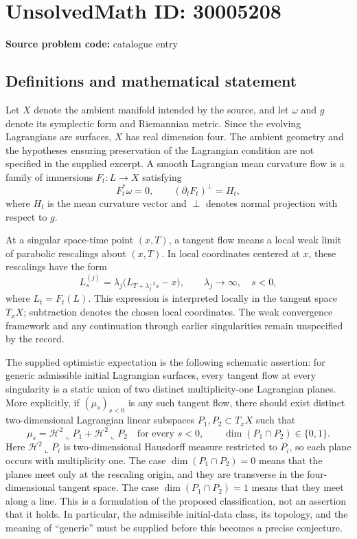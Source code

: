 \documentclass[11pt]{article}
\begin{document}
\section*{UnsolvedMath ID: 30005208}
\textbf{Source problem code:} catalogue entry
\subsection{Definitions and mathematical statement}
Let \(X\) denote the ambient manifold intended by the source, and let \(\omega\) and \(g\) denote its symplectic form and Riemannian metric. Since the evolving Lagrangians are surfaces, \(X\) has real dimension four. The ambient geometry and the hypotheses ensuring preservation of the Lagrangian condition are not specified in the supplied excerpt. A smooth Lagrangian mean curvature flow is a family of immersions \(F_t\colon L\to X\) satisfying
\[
F_t^*\omega=0,\qquad (\partial_tF_t)^\perp=H_t,
\]
where \(H_t\) is the mean curvature vector and \(\perp\) denotes normal projection with respect to \(g\).

At a singular space-time point \((x,T)\), a tangent flow means a local weak limit of parabolic rescalings about \((x,T)\). In local coordinates centered at \(x\), these rescalings have the form
\[
L_s^{(j)}=\lambda_j\bigl(L_{T+\lambda_j^{-2}s}-x\bigr),\qquad \lambda_j\longrightarrow\infty,\quad s<0,
\]
where \(L_t=F_t(L)\). This expression is interpreted locally in the tangent space \(T_xX\); subtraction denotes the chosen local coordinates. The weak convergence framework and any continuation through earlier singularities remain unspecified by the record.

The supplied optimistic expectation is the following schematic assertion: for generic admissible initial Lagrangian surfaces, every tangent flow at every singularity is a static union of two distinct multiplicity-one Lagrangian planes. More explicitly, if \((\mu_s)_{s<0}\) is any such tangent flow, there should exist distinct two-dimensional Lagrangian linear subspaces \(P_1,P_2\subset T_xX\) such that
\[
\mu_s=\mathcal H^2\!\llcorner P_1+\mathcal H^2\!\llcorner P_2
\quad\text{for every }s<0,
\qquad
\dim(P_1\cap P_2)\in\{0,1\}.
\]
Here \(\mathcal H^2\!\llcorner P_i\) is two-dimensional Hausdorff measure restricted to \(P_i\), so each plane occurs with multiplicity one. The case \(\dim(P_1\cap P_2)=0\) means that the planes meet only at the rescaling origin, and they are transverse in the four-dimensional tangent space. The case \(\dim(P_1\cap P_2)=1\) means that they meet along a line. This is a formulation of the proposed classification, not an assertion that it holds. In particular, the admissible initial-data class, its topology, and the meaning of ``generic'' must be supplied before this becomes a precise conjecture.
\end{document}
